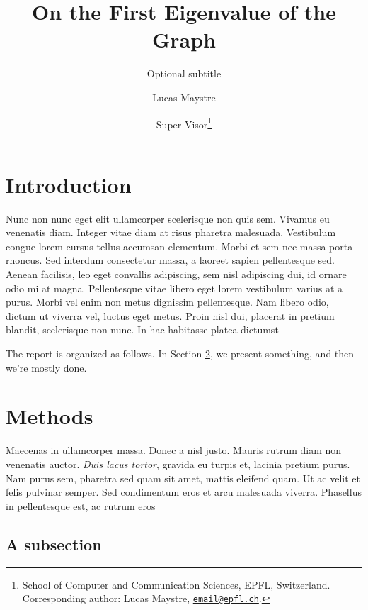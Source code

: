 \documentclass[12pt,a4paper,oneside]{paper} %
\title{On the First Eigenvalue of the Graph}
\subtitle{Optional subtitle}
\author{Lucas Maystre \and Super Visor\thanks{School of Computer and
Communication Sciences, EPFL, Switzerland. Corresponding author: Lucas Maystre,
\href{mailto:email@epfl.ch}{\nolinkurl{email@epfl.ch}}.}}
\begin{document}
\maketitle



\section{Introduction} %
\label{sec:intro}

Nunc non nunc eget elit ullamcorper scelerisque non quis sem. Vivamus eu
venenatis diam. Integer vitae diam at risus pharetra malesuada. Vestibulum
congue lorem cursus tellus accumsan elementum. Morbi et sem nec massa porta
rhoncus. Sed interdum \citep{lecun2004learning} consectetur massa, a laoreet
sapien pellentesque sed.  Aenean facilisis, leo eget convallis adipiscing, sem
nisl adipiscing dui, id ornare odio mi at magna. Pellentesque vitae libero eget
lorem vestibulum varius at a purus. Morbi vel enim non metus dignissim
pellentesque. Nam libero odio, dictum ut viverra vel, luctus eget metus. Proin
nisl dui, placerat in pretium blandit, scelerisque non nunc. In hac habitasse
platea dictumst

The report is organized as follows. In Section \ref{sec:methods}, we present
something, and then we're mostly done.


\section{Methods} %
\label{sec:methods}

Maecenas in ullamcorper massa. Donec a nisl justo. Mauris rutrum diam non
venenatis auctor. \emph{Duis lacus tortor}, gravida eu turpis et, lacinia
pretium purus. Nam purus sem, pharetra sed quam sit amet, mattis eleifend quam.
Ut ac velit et felis pulvinar semper. Sed condimentum eros et arcu malesuada
viverra.  Phasellus in pellentesque est, ac rutrum eros

\subsection{A subsection}
\end{document}
